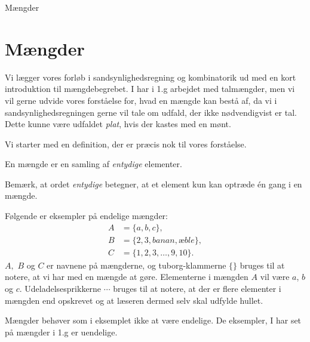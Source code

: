 
\begin{center}
\Huge
Mængder
\end{center}

\section*{Mængder}
Vi lægger vores forløb i sandsynlighedsregning og kombinatorik ud med en kort introduktion til mængdebegrebet. I har i 1.g arbejdet med talmængder, men vi vil gerne udvide vores forståelse for, hvad en mængde kan bestå af, da vi i sandsynlighedsregningen gerne vil tale om udfald, der ikke nødvendigvist er tal. Dette kunne være udfaldet \textit{plat}, hvis der kastes med en mønt.  

Vi starter med en definition, der er præcis nok til vores forståelse.
\begin{defn}[Mængde]
En mængde er en samling af \textit{entydige} elementer. 
\end{defn}
Bemærk, at ordet \textit{entydige} betegner, at et element kun kan optræde én gang i en mængde. 
\begin{exa}
	Følgende er eksempler på endelige mængder:
	\begin{align*}
		A &= \{a,b,c\},\\
		B &= \{2,3,banan,æble\},\\
		C &= \{1,2,3,\hdots,9,10\}.
	\end{align*}
	$A,$ $B$ og $C$ er navnene på mængderne, og tuborg-klammerne $\{\}$ bruges til at notere, at vi har med en mængde at gøre. Elementerne i mængden $A$ vil være $a$, $b$ og
	$c$. Udeladelsesprikkerne $\cdots$ bruges til at notere, at der er flere elementer i mængden end opskrevet og at læseren dermed selv skal udfylde hullet. 
\end{exa}
Mængder behøver som i eksemplet ikke at være endelige. De eksempler, I har set på mængder i 1.g er uendelige.

